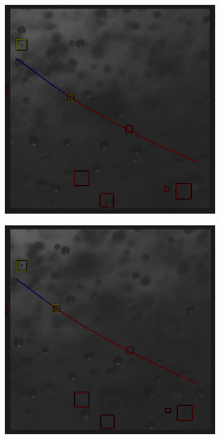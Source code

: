 			\begin{figure}	
				\centering
				\begin{subfigure}[t]{.4\textwidth}
					\centering
					\includegraphics[scale=0.45]{images/tracking_green.png}
					\caption{}
					\label{subfig:green_1}
				\end{subfigure}\hfill
				\begin{subfigure}[t]{.4\textwidth}
					\centering
					\includegraphics[scale=0.45]{images/tracking_green_2.png}
					\caption{}
					\label{subfig:green_2}
				\end{subfigure}


\end{figure}
